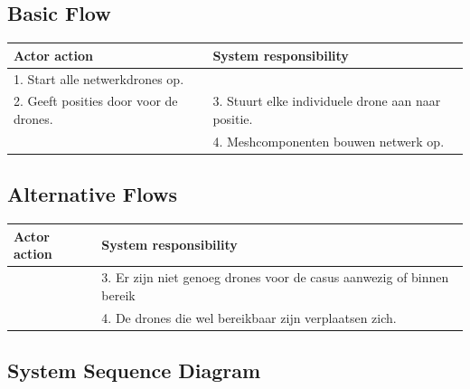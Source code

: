 \documentclass[a4paper, 11pt, oneside]{report}
\begin{document}
\subsection{Basic Flow }


\begin{table}[H]
	\centering
	\begin{tabular}{|l|l|}
		\hline
		\rowcolor[HTML]{C0C0C0} 
		Actor action  & System responsibility   \\ \hline
		1. Start alle netwerkdrones op. 		& \\ \hline
		2. Geeft posities door voor de drones.  & 3. Stuurt elke individuele drone aan naar positie.    \\ \hline
												& 4. Meshcomponenten bouwen netwerk op.                 \\ \hline
	\end{tabular}
\end{table}

\subsection{Alternative Flows}


\begin{table}[H]
	\centering
	\begin{tabular}{|l|l|}
		\hline
		\rowcolor[HTML]{C0C0C0} 
		Actor action  & System responsibility   \\ \hline
		& 3. Er zijn niet genoeg drones voor de casus aanwezig of binnen bereik    \\ \hline
		& 4. De drones die wel bereikbaar zijn verplaatsen zich.      	    \\ \hline
	\end{tabular}
\end{table}

\subsection{System Sequence Diagram }
\label{Usecase:ontplooien:systemsequence}
\end{document}
